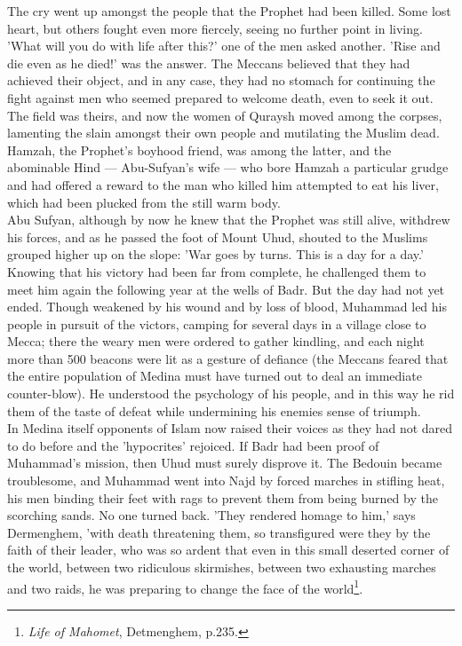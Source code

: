 \documentclass[11pt, b5paper, twoside]{book}
\begin{document}
The cry went up amongst the people that the Prophet had been killed. Some lost heart, but others 
fought even more fiercely, seeing no further point in living. 'What will you do with life after 
this?' one of the men asked another. 'Rise and die even as he died!' was the answer. The Meccans 
believed that they had achieved their object, and in any case, they had no stomach for continuing the 
fight against men who seemed prepared to welcome death, even to seek it out. The field was theirs, 
and now the women of Quraysh moved among the corpses, lamenting the slain amongst their own people 
and mutilating the Muslim dead. Hamzah, the Prophet's boyhood friend, was among the latter, and the 
abominable Hind --- Abu-Sufyan's wife --- who bore Hamzah a particular grudge and had offered a reward to the man who killed him attempted to eat his liver, which had been plucked from the still warm 
body. \\

Abu Sufyan, although by now he knew that the Prophet was still alive, withdrew his forces, and as he 
passed the foot of Mount Uhud, shouted to the Muslims grouped higher up on the slope: 'War goes by 
turns. This is a day for a day.' Knowing that his victory had been far from complete, he challenged 
them to meet him again the following year at the wells of Badr. But the day had not yet ended. Though 
weakened by his wound and by loss of blood, Muhammad led his people in pursuit of the victors, 
camping for several days in a village close to Mecca; there the weary men were ordered to gather 
kindling, and each night more than 500 beacons were lit as a gesture of defiance (the Meccans feared 
that the entire population of Medina must have turned out to deal an immediate counter-blow). He 
understood the psychology of his people, and in this way he rid them of the taste of defeat while 
undermining his enemies sense of triumph. \\

In Medina itself opponents of Islam now raised their voices as they had not dared to do before and 
the 'hypocrites' rejoiced. If Badr had been proof of Muhammad's mission, then Uhud must surely 
disprove it. The Bedouin became troublesome, and Muhammad went into Najd by forced marches in 
stifling heat, his men binding their feet with rags to prevent them from being burned by the 
scorching sands. No one turned back. 'They rendered homage to him,' says Dermenghem, 'with death 
threatening them, so transfigured were they by the faith of their leader, who was so ardent that even 
in this small deserted corner of the world, between two ridiculous skirmishes, between two exhausting 
marches and two raids, he was preparing to change the face of the world\footnote{\emph{Life of Mahomet}, Detmenghem, p.235.}.\\
\end{document}

